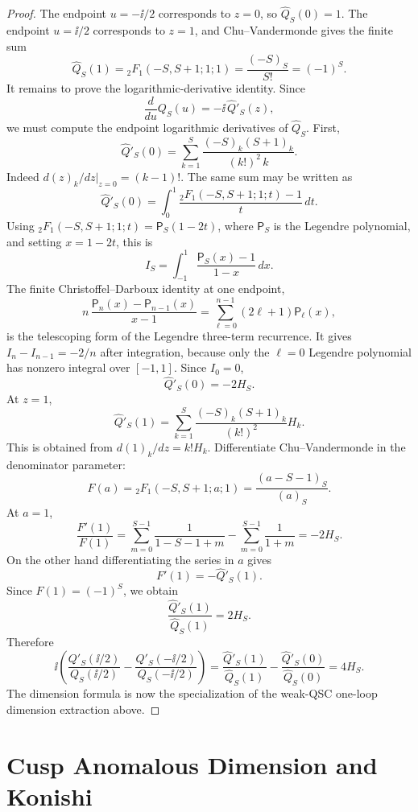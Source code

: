 \begin{proof}
The endpoint \(u=-\ii/2\) corresponds to \(z=0\), so
\(\widehat Q_S(0)=1\).  The endpoint \(u=\ii/2\) corresponds to \(z=1\), and
Chu--Vandermonde gives the finite sum
\[
  \widehat Q_S(1)
  =
  {}_2F_1(-S,S+1;1;1)
  =
  \frac{(-S)_S}{S!}=(-1)^S.
\]
It remains to prove the logarithmic-derivative identity.  Since
\[
  \frac{d}{du}Q_S(u)=-\ii\,\widehat Q'_S(z),
\]
we must compute the endpoint logarithmic derivatives of \(\widehat Q_S\).
First,
\begin{equation}
  \widehat Q'_S(0)
  =
  \sum_{k=1}^{S}
  \frac{(-S)_k(S+1)_k}{(k!)^2\,k}.
  \label{eq:qsc-twist-two-derivative-zero-sum}
\end{equation}
Indeed \(d(z)_k/dz|_{z=0}=(k-1)!\).  The same sum may be written as
\[
  \widehat Q'_S(0)
  =
  \int_0^1
  \frac{{}_2F_1(-S,S+1;1;t)-1}{t}\,dt .
\]
Using \({}_2F_1(-S,S+1;1;t)=\mathsf P_S(1-2t)\), where
\(\mathsf P_S\) is the Legendre polynomial, and setting \(x=1-2t\), this is
\[
  I_S=\int_{-1}^{1}\frac{\mathsf P_S(x)-1}{1-x}\,dx .
\]
The finite Christoffel--Darboux identity at one endpoint,
\[
  n\,\frac{\mathsf P_n(x)-\mathsf P_{n-1}(x)}{x-1}
  =
  \sum_{\ell=0}^{n-1}(2\ell+1)\mathsf P_\ell(x),
\]
is the telescoping form of the Legendre three-term recurrence.  It gives
\(I_n-I_{n-1}=-2/n\) after integration, because only the \(\ell=0\) Legendre
polynomial has nonzero integral over \([-1,1]\).  Since \(I_0=0\),
\[
  \widehat Q'_S(0)=-2H_S.
\]
At \(z=1\),
\[
  \widehat Q'_S(1)
  =
  \sum_{k=1}^{S}
  \frac{(-S)_k(S+1)_k}{(k!)^2}H_k .
\]
This is obtained from \(d(1)_k/dz=k!H_k\).  Differentiate
Chu--Vandermonde in the denominator parameter:
\[
  F(a)={}_2F_1(-S,S+1;a;1)
  =
  \frac{(a-S-1)_S}{(a)_S}.
\]
At \(a=1\),
\[
  \frac{F'(1)}{F(1)}
  =
  \sum_{m=0}^{S-1}\frac{1}{1-S-1+m}
  -
  \sum_{m=0}^{S-1}\frac{1}{1+m}
  =
  -2H_S .
\]
On the other hand differentiating the series in \(a\) gives
\[
  F'(1)=-\widehat Q'_S(1).
\]
Since \(F(1)=(-1)^S\), we obtain
\[
  \frac{\widehat Q'_S(1)}{\widehat Q_S(1)}=2H_S.
\]
Therefore
\[
  \ii\left(
  \frac{Q'_S(\ii/2)}{Q_S(\ii/2)}
  -
  \frac{Q'_S(-\ii/2)}{Q_S(-\ii/2)}
  \right)
  =
  \frac{\widehat Q'_S(1)}{\widehat Q_S(1)}
  -\frac{\widehat Q'_S(0)}{\widehat Q_S(0)}
  =
  4H_S.
\]
The dimension formula is now the specialization of
the weak-QSC one-loop dimension extraction above.
\end{proof}

\section{Cusp Anomalous Dimension and Konishi}

